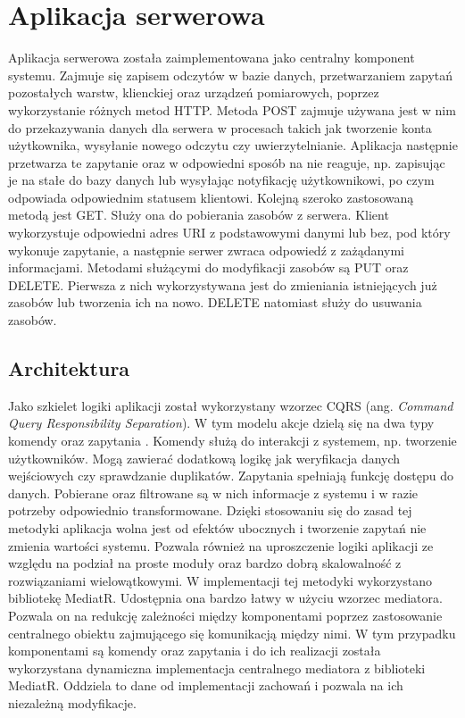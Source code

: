 \section{Aplikacja serwerowa}
Aplikacja serwerowa została zaimplementowana jako centralny komponent systemu.
Zajmuje się zapisem odczytów w bazie danych, przetwarzaniem zapytań
pozostałych warstw, klienckiej oraz urządzeń pomiarowych,
poprzez wykorzystanie różnych metod HTTP.
Metoda POST zajmuje używana jest w nim do przekazywania danych
dla serwera w procesach takich jak tworzenie konta użytkownika,
wysyłanie nowego odczytu czy uwierzytelnianie.
Aplikacja następnie przetwarza te zapytanie oraz w odpowiedni 
sposób na nie reaguje, np. zapisując je na stałe do bazy danych 
lub wysyłając notyfikację użytkownikowi, po czym odpowiada
odpowiednim statusem klientowi.
Kolejną szeroko zastosowaną metodą jest GET. Służy ona do pobierania
zasobów z serwera. Klient wykorzystuje odpowiedni adres URI z
podstawowymi danymi lub bez, pod który wykonuje zapytanie, a
następnie serwer zwraca odpowiedź z zażądanymi informacjami.
Metodami służącymi do modyfikacji zasobów są PUT oraz DELETE.
Pierwsza z nich wykorzystywana jest do zmieniania istniejących
już zasobów lub tworzenia ich na nowo. DELETE natomiast służy
do usuwania zasobów.

\subsection{Architektura}
Jako szkielet logiki aplikacji został wykorzystany wzorzec CQRS 
(ang. \textit{Command Query Responsibility Separation}).
W tym modelu akcje dzielą się na dwa typy komendy oraz zapytania \cite{fowler:cqrs}.
Komendy służą do interakcji z systemem, np. tworzenie użytkowników.
Mogą zawierać dodatkową logikę jak weryfikacja danych wejściowych 
czy sprawdzanie duplikatów.
Zapytania spełniają funkcję dostępu do danych. Pobierane oraz
filtrowane są w nich informacje z systemu i w razie potrzeby
odpowiednio transformowane.
Dzięki stosowaniu się do zasad tej metodyki aplikacja wolna
jest od efektów ubocznych i tworzenie zapytań nie zmienia
wartości systemu. Pozwala również na uproszczenie logiki
aplikacji ze względu na podział na proste moduły oraz bardzo
dobrą skalowalność z rozwiązaniami wielowątkowymi.
W implementacji tej metodyki wykorzystano bibliotekę MediatR.
Udostępnia ona bardzo łatwy w użyciu wzorzec mediatora.
Pozwala on na redukcję zależności między komponentami poprzez
zastosowanie centralnego obiektu zajmującego się komunikacją między nimi\cite{freeman2004head}.
W tym przypadku komponentami są komendy oraz zapytania i do ich realizacji
została wykorzystana dynamiczna implementacja centralnego
mediatora z biblioteki MediatR. Oddziela to dane od implementacji
zachowań i pozwala na ich niezależną modyfikacje.

